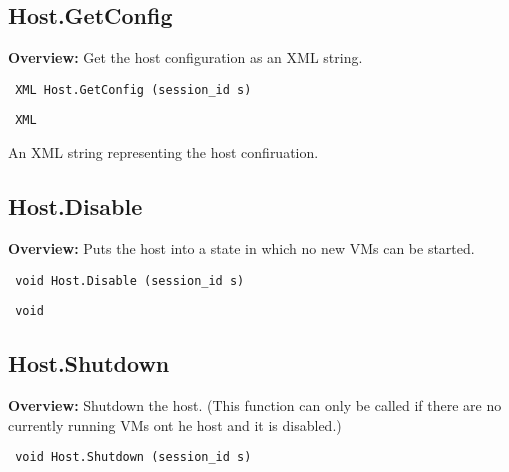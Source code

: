 \subsection{Host.GetConfig}

{\bf Overview:} 
Get the host configuration as an XML string.

\begin{verbatim} XML Host.GetConfig (session_id s)\end{verbatim}


\vspace{0.3cm}

{\tt 
XML
}


An XML string representing the host confiruation.
\vspace{0.3cm}
\vspace{0.3cm}
\vspace{0.3cm}

\subsection{Host.Disable}

{\bf Overview:} 
Puts the host into a state in which no new VMs can be started.

\begin{verbatim} void Host.Disable (session_id s)\end{verbatim}


\vspace{0.3cm}

{\tt 
void
}



\vspace{0.3cm}
\vspace{0.3cm}
\vspace{0.3cm}

\subsection{Host.Shutdown}

{\bf Overview:} 
Shutdown the host. (This function can only be called if there are no currently running VMs ont he host and it is disabled.)

\begin{verbatim} void Host.Shutdown (session_id s)\end{verbatim}


